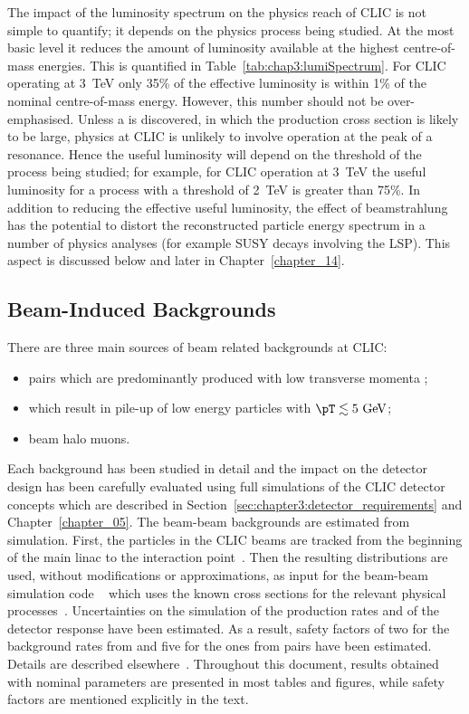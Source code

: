 The impact of the luminosity spectrum on the physics reach of CLIC is not simple
to quantify; it depends on the physics process being studied. At the most basic
level it reduces the amount of luminosity available at the highest
centre-of-mass energies. This is quantified in
Table~\ref{tab:chap3:lumiSpectrum}. For CLIC operating at 3~TeV only 35\% of
the effective luminosity is within 1\% of the nominal centre-of-mass energy.
However, this number should not be over-emphasised. Unless a \Zprime
is discovered, in which the production cross section is likely to be large,
physics at CLIC is unlikely to involve operation at the peak of a resonance.
Hence the useful luminosity will depend on the threshold of the process being
studied; for example, for CLIC operation at 3~TeV the useful luminosity for a
process with a threshold of 2~TeV is greater than 75\%. In addition to
reducing the effective useful luminosity, the effect of beamstrahlung has the
potential to distort the reconstructed particle energy spectrum in a number of
physics analyses (for example \acs{SUSY} decays involving the \acs{LSP}). This aspect is
discussed below and later in Chapter~\ref{chapter_14}.

\subsection{Beam-Induced Backgrounds\label{sec:chapter3:environment:beambackgrounds}}

There are three main sources of beam related backgrounds at CLIC:
\begin{itemize}
 \item \epem pairs which are predominantly produced with low transverse momenta \pT;
 \item \gghadrons which result in pile-up of low energy particles with $\pT \lesssim 5~\mathrm{GeV}$;
 \item beam halo muons.
\end{itemize}
Each background has been studied in detail and the impact on the detector
design has been carefully evaluated using full \geant simulations of the CLIC
detector concepts which are described in Section~\ref{sec:chapter3:detector_requirements} and
Chapter~\ref{chapter_05}. The beam-beam
backgrounds are estimated from simulation. First, the particles in the CLIC beams are
tracked from the beginning of the main linac to the interaction
point~\cite{Schulte:572820}. Then the resulting distributions are used,
without modifications or approximations,
as input for the beam-beam simulation code
\guineapig~\cite{Schulte:1999tx} which uses the known cross sections for the
relevant physical processes~\cite{Schulte1996}. 
Uncertainties on the simulation of the production rates and of the
detector response have been estimated. As a result, safety factors of
two for the background rates from \gghadrons and five for the ones
from \epem pairs have been estimated. Details are described
elsewhere~\cite{barklow_bg,lcd:2011-DannheimSailerBgrNote}.
Throughout this document,
results obtained with nominal parameters are presented in most tables
and figures, while safety factors are mentioned explicitly in the text.

